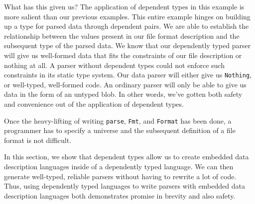 What has this given us? The application of dependent types in this example is
more salient than our previous examples. This entire example hinges on building
up a type for parsed data through dependent pairs. We are able to establish the
relationship between the values present in our file format description and the
subsequent type of the parsed data. We know that our dependently typed parser
will give us well-formed data that fits the constraints of our file description
or nothing at all. A parser without dependent types could not enforce such
constraints in its static type system. Our data parser will either give us
\texttt{Nothing}, or well-typed, well-formed code. An ordinary parser will
only be able to give us data in the form of an untyped blob. In other words, 
we've gotten both safety and convenience out of the application of dependent
types. 

Once the heavy-lifting of writing \texttt{parse}, \texttt{Fmt}, and
\texttt{Format} has been done, a programmer has to specify a universe and the
subsequent definition of a file format is not difficult.  

In this section, we show that dependent types allow us to create embedded data
description languages inside of a dependently typed language. We can then
generate well-typed, reliable parsers without having to rewrite a lot of code.
Thus, using dependently typed languages to write parsers with embedded data
description languages both demonstrates promise in brevity and also safety. 